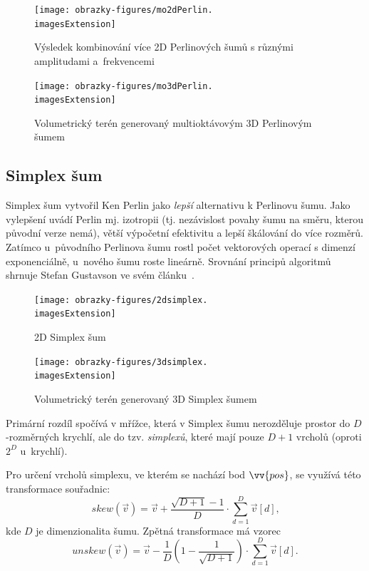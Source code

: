 \begin{figure}[H]
	\centering
	\begin{minipage}[t]{0.48\textwidth}
		\centering
		\texttt{[image: obrazky-figures/mo2dPerlin.\\imagesExtension]}
		\caption{Výsledek kombinování více 2D Perlinových šumů s různými amplitudami a~frekvencemi}
	\end{minipage}
	\hfill
	\begin{minipage}[t]{0.48\textwidth}
		\centering
		\texttt{[image: obrazky-figures/mo3dPerlin.\\imagesExtension]}
		\caption{Volumetrický terén generovaný multioktávovým 3D Perlinovým šumem}
	\end{minipage}
\end{figure}

\subsection{Simplex šum}
Simplex šum vytvořil Ken Perlin \cite{Perlin2002} jako \textit{lepší} alternativu k Perlinovu šumu. Jako vylepšení uvádí Perlin mj. izotropii (tj. nezávislost povahy šumu na směru, kterou původní verze nemá), větší výpočetní efektivitu a lepší škálování do více rozměrů. Zatímco u~původního Perlinova šumu rostl počet vektorových operací s dimenzí exponenciálně, u~nového šumu roste lineárně. Srovnání principů algoritmů shrnuje Stefan Gustavson ve svém článku~\cite{Gustavson2005}.

\begin{figure}[H]
	\centering
	\begin{minipage}[t]{0.48\textwidth}
		\centering
		\texttt{[image: obrazky-figures/2dsimplex.\\imagesExtension]}
		\caption{2D Simplex šum}
	\end{minipage}
	\hfill
	\begin{minipage}[t]{0.48\textwidth}
		\centering
		\texttt{[image: obrazky-figures/3dsimplex.\\imagesExtension]}
		\caption{Volumetrický terén generovaný 3D Simplex šumem}
	\end{minipage}
\end{figure}

Primární rozdíl spočívá v mřížce, která v Simplex šumu nerozděluje prostor do $D$-roz\-měrných krychlí, ale do tzv. \textit{simplexů}, které mají pouze $D+1$ vrcholů (oproti $2^D$ u~krychlí).

Pro určení vrcholů simplexu, ve kterém se nachází bod $\vv{pos}$, se využívá této transformace souřadnic:
\begin{equation}
	skew(\vec{v}) = \vec{v} + \dfrac{\sqrt{D + 1} - 1}{D} \cdot \sum_{d = 1}^{D} \vec{v}[d] \text{,}
\end{equation}
kde $D$ je dimenzionalita šumu. Zpětná transformace má vzorec
\begin{equation}
	unskew(\vec{v}) = \vec{v} - \dfrac{1}{D} \left(1 - \dfrac{1}{\sqrt{D + 1}}\right) \cdot \sum_{d = 1}^{D} \vec{v}[d] \text{.}
\end{equation}


